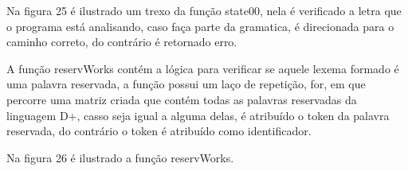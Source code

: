 \documentclass[12pt,oneside,a4paper,chapter=TITLE,section=TITLE,sumario=tradicional]{abntex2}
\begin{document}
Na figura 25 é ilustrado um trexo da função state00, nela é verificado a letra que o programa está analisando, caso faça parte da gramatica, é direcionada para o caminho correto, do contrário é retornado erro.

\begin{figure}[htb]
\end{figure} 

A função reservWorks contém a lógica para verificar se aquele lexema formado é uma palavra reservada, a função possui um laço de repetição, for, em que percorre uma matriz criada que contém todas as palavras reservadas da linguagem D+, casso seja igual a alguma delas, é atribuído o token da palavra reservada, do contrário o token é atribuído como identificador.

Na figura 26 é ilustrado a função reservWorks.

\begin{figure}[htb]
\end{figure} 
\end{document}
